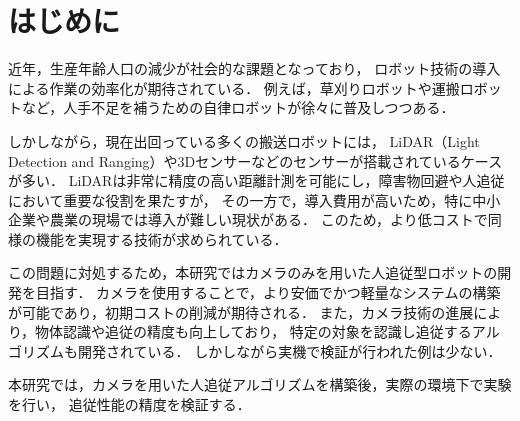 \section{はじめに}

近年，生産年齢人口の減少が社会的な課題となっており，
ロボット技術の導入による作業の効率化が期待されている．
例えば，草刈りロボットや運搬ロボットなど，人手不足を補うための自律ロボットが徐々に普及しつつある．

しかしながら，現在出回っている多くの搬送ロボットには，
LiDAR（Light Detection and Ranging）や3Dセンサーなどのセンサーが搭載されているケースが多い．
LiDARは非常に精度の高い距離計測を可能にし，障害物回避や人追従において重要な役割を果たすが，
その一方で，導入費用が高いため，特に中小企業や農業の現場では導入が難しい現状がある．
このため，より低コストで同様の機能を実現する技術が求められている．

この問題に対処するため，本研究ではカメラのみを用いた人追従型ロボットの開発を目指す．
カメラを使用することで，より安価でかつ軽量なシステムの構築が可能であり，初期コストの削減が期待される．
また，カメラ技術の進展により，物体認識や追従の精度も向上しており，
特定の対象を認識し追従するアルゴリズムも開発されている\cite{roshon}．
しかしながら実機で検証が行われた例は少ない．

本研究では，カメラを用いた人追従アルゴリズムを構築後，実際の環境下で実験を行い，
追従性能の精度を検証する．
